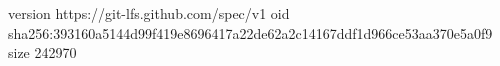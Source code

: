 version https://git-lfs.github.com/spec/v1
oid sha256:393160a5144d99f419e8696417a22de62a2c14167ddf1d966ce53aa370e5a0f9
size 242970
